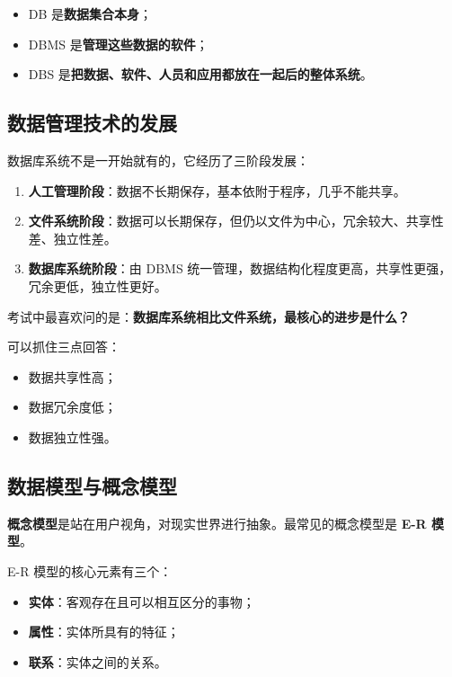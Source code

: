 \documentclass{../../note}
\begin{document}
\begin{itemize}
  \item DB 是\textbf{数据集合本身}；
  \item DBMS 是\textbf{管理这些数据的软件}；
  \item DBS 是\textbf{把数据、软件、人员和应用都放在一起后的整体系统}。
\end{itemize}

\subsection{数据管理技术的发展}

数据库系统不是一开始就有的，它经历了三阶段发展：

\begin{enumerate}
  \item \textbf{人工管理阶段}：数据不长期保存，基本依附于程序，几乎不能共享。
  \item \textbf{文件系统阶段}：数据可以长期保存，但仍以文件为中心，冗余较大、共享性差、独立性差。
  \item \textbf{数据库系统阶段}：由 DBMS 统一管理，数据结构化程度更高，共享性更强，冗余更低，独立性更好。
\end{enumerate}

考试中最喜欢问的是：\textbf{数据库系统相比文件系统，最核心的进步是什么？}

可以抓住三点回答：

\begin{itemize}
  \item 数据共享性高；
  \item 数据冗余度低；
  \item 数据独立性强。
\end{itemize}

\subsection{数据模型与概念模型}

\textbf{概念模型}是站在用户视角，对现实世界进行抽象。最常见的概念模型是 \textbf{E-R 模型}。

E-R 模型的核心元素有三个：

\begin{itemize}
  \item \textbf{实体}：客观存在且可以相互区分的事物；
  \item \textbf{属性}：实体所具有的特征；
  \item \textbf{联系}：实体之间的关系。
\end{itemize}
\end{document}
